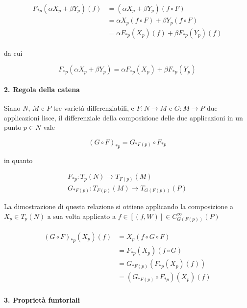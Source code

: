 \begin{align}
	\begin{split}
		F_{*p}(\alpha X_{p} + \beta Y_{p})(f) &= (\alpha X_{p} + \beta Y_{p})(f \circ F) \\
		&= \alpha X_{p}(f \circ F) + \beta Y_{p}(f \circ F) \\
		&= \alpha F_{*p}(X_{p})(f) + \beta F_{*p}(Y_{p})(f)
	\end{split}
\end{align}

da cui

\begin{equation}
	F_{*p}(\alpha X_{p} + \beta Y_{p}) = \alpha F_{*p}(X_{p}) + \beta F_{*p}(Y_{p})
\end{equation}

\paragraph{2. Regola della catena}

Siano $ N $, $ M $ e $ P $ tre varietà differenziabili, e $ F : N \to M $ e $ G : M \to P $ due applicazioni lisce, il differenziale della composizione delle due applicazioni in un punto $ p \in N $ vale

\begin{equation}
	(G \circ F)_{*p} = G_{*F(p)} \circ F_{*p}
\end{equation}

in quanto

\begin{gather}
	F_{*p} : T_{p}(N) \to T_{F(p)}(M) \\
	G_{*F(p)} : T_{F(p)}(M) \to T_{G(F(p))}(P)
\end{gather}

La dimostrazione di questa relazione si ottiene applicando la composizione a $ X_{p} \in T_{p}(N) $ a sua volta applicato a $ f \in [(f,W)] \in C_{G(F(p))}^{\infty}(P) $

\begin{align}
	\begin{split}
		(G \circ F)_{*p} (X_{p})(f) &= X_{p} (f \circ G \circ F) \\
		&= F_{*p} (X_{p}) (f \circ G) \\
		&= G_{*F(p)} (F_{*p} (X_{p})(f)) \\
		&= (G_{*F(p)} \circ F_{*p})(X_{p})(f)
	\end{split}
\end{align}

\paragraph{3. Proprietà funtoriali}\label{par:funt-prop}

